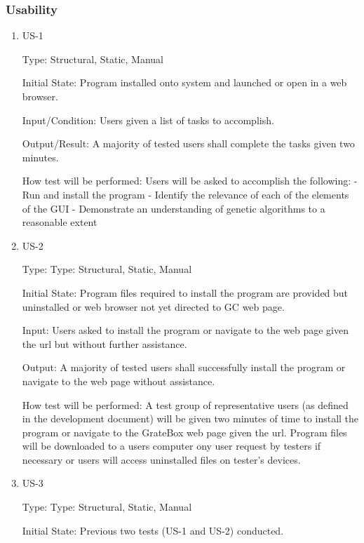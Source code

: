 \documentclass[12pt, titlepage]{article}
\begin{document}
\subsubsection{Usability}

\begin{enumerate}

\item{US-1\\}

Type: Structural, Static, Manual
					
Initial State: Program installed onto system and launched or open in a web 
browser.
					
Input/Condition: Users given a list of tasks to accomplish.
					
Output/Result: A majority of tested users shall complete the tasks given two 
minutes.
					
How test will be performed: Users will be asked to accomplish the following:
- Run and install the program
- Identify the relevance of each of the elements of the GUI
- Demonstrate an understanding of genetic algorithms to a reasonable extent

\item{US-2\\}

Type: Type: Structural, Static, Manual
					
Initial State: Program files required to install the program are provided but 
uninstalled or web browser not yet directed to GC web page.
					
Input: Users asked to install the program or navigate to the web page given the 
url but without further assistance.
					
Output: A majority of tested users shall successfully install the program or 
navigate to the web page without assistance.
					
How test will be performed: A test group of representative users (as defined in 
the development document) will be given two minutes of time to install the 
program or navigate to the GrateBox web page given the url. Program files will 
be 
downloaded to a users computer ony user request by testers if necessary or users 
will access uninstalled files on tester's devices.

\item{US-3\\}

Type: Type: Structural, Static, Manual
					
Initial State: Previous two tests (US-1 and US-2) conducted.
					

\end{enumerate}
\end{document}
